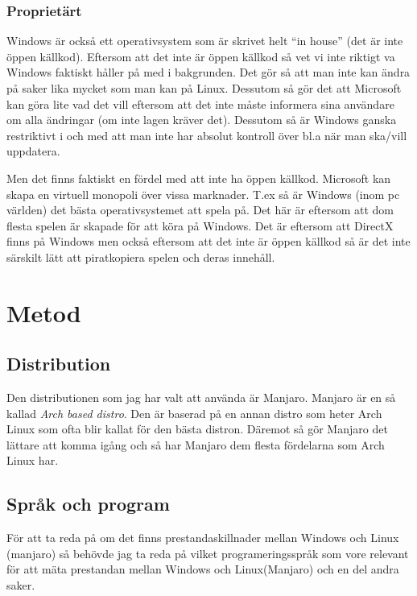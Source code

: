 \documentclass[12pt, a4paper]{report}
\begin{document}
    \subsubsection{Proprietärt}
    Windows är också ett operativsystem som är skrivet helt ``in house'' (det är inte öppen källkod).
    Eftersom att det inte är öppen källkod så vet vi inte riktigt va Windows faktiskt håller på med i bakgrunden. Det gör så att man inte kan ändra på saker lika mycket som man kan på Linux. Dessutom så gör det att Microsoft kan göra lite vad det vill eftersom att det inte måste informera sina användare om alla ändringar (om inte lagen kräver det). Dessutom så är Windows ganska restriktivt i och med att man inte har absolut kontroll över bl.a när man ska/vill uppdatera.


   Men det finns faktiskt en fördel med att inte ha öppen källkod. Microsoft kan skapa en virtuell monopoli över vissa marknader. T.ex så är Windows (inom pc världen) det bästa operativsystemet att spela på. Det här är eftersom att dom flesta spelen är skapade för att köra på Windows. Det är eftersom att DirectX\cite{directx} finns på Windows men också eftersom att det inte är öppen källkod så är det inte särskilt lätt att piratkopiera spelen och deras innehåll.


 
\section{Metod}
 
\subsection{Distribution}
Den distributionen som jag har valt att använda är Manjaro\cite{manjaro}. Manjaro är en så kallad \textit{Arch based distro}. Den är baserad på en annan distro som heter Arch Linux som ofta blir kallat för den bästa distron. Däremot så gör Manjaro det lättare att komma igång och så har Manjaro dem flesta fördelarna som Arch Linux har.

\subsection{Språk och program}
 
För att ta reda på om det finns prestandaskillnader mellan Windows och Linux (manjaro) så behövde jag ta reda på vilket programeringsspråk som vore relevant för att mäta prestandan mellan Windows och Linux(Manjaro) och en del andra saker.
\end{document}
